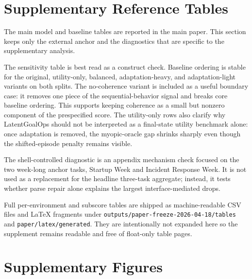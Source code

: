 \section{Supplementary Reference Tables}

The main model and baseline tables are reported in the main paper. This section
keeps only the external anchor and the diagnostics that are specific to the
supplementary analysis.







The sensitivity table is best read as a construct check. Baseline ordering is
stable for the original, utility-only, balanced, adaptation-heavy, and
adaptation-light variants on both splits. The no-coherence variant is included
as a useful boundary case: it removes one piece of the sequential-behavior
signal and breaks core baseline ordering. This supports keeping coherence as a
small but nonzero component of the prespecified score. The utility-only rows
also clarify why LatentGoalOps should not be interpreted as a final-state
utility benchmark alone: once adaptation is removed, the myopic-oracle gap
shrinks sharply even though the shifted-episode penalty remains visible.







The shell-controlled diagnostic is an appendix mechanism check focused on the
two week-long anchor tasks, Startup Week and Incident Response Week. It is not
used as a replacement for the headline three-task aggregate; instead, it tests
whether parse repair alone explains the largest interface-mediated drops.



Full per-environment and subscore tables are shipped as machine-readable CSV
files and LaTeX fragments under \texttt{outputs/paper-freeze-2026-04-18/tables}
and \texttt{paper/latex/generated}. They are intentionally not expanded here so
the supplement remains readable and free of float-only table pages.

\section{Supplementary Figures}

